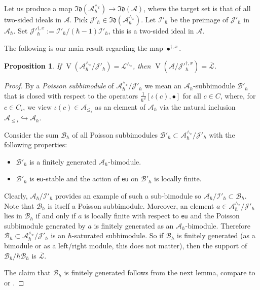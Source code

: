 \documentclass[12pt]{amsart}
\newcommand{\A}{\mathcal{A}}
\newcommand{\I}{\mathcal{I}}
\newcommand{\VA}{\operatorname{V}}
\newcommand{\B}{\mathcal{B}}
\newcommand{\J}{\mathcal{J}}
\newtheorem{Prop}[Thm]{Proposition}
\theoremstyle{definition}
\begin{document}
Let us produce a map $\mathfrak{Id}(\A^{\wedge_x}_{\hbar})\rightarrow \mathfrak{Id}(\A)$,
where the target set is that of all two-sided ideals in $\A$. Pick $\J'_\hbar\in
\mathfrak{Id}(\A^{\wedge_x}_{\hbar})$. Let $\I'_\hbar$ be the preimage of $\J'_\hbar$
in $\A_\hbar$. Set $\J'^{\dagger,x}_\hbar:=\I'_\hbar/(\hbar-1)\I'_\hbar$, this is a two-sided
ideal in $\A$.


The following is our main result regarding the map $\bullet^{\dagger,x}$.

\begin{Prop}\label{Prop:support}
If $\VA(\A^{\wedge_x}_\hbar/\J'_{\hbar})=\mathcal{L}^{\wedge_x}$, then $\VA(\A/\J'^{\dagger,x}_\hbar)=\overline{\mathcal{L}}$.
\end{Prop}
\begin{proof}
By a {\it Poisson subbimodule} of $\A^{\wedge_x}_\hbar/\J'_\hbar$ we mean
an $\A_\hbar$-subbimodule $\B'_\hbar$ that is closed with respect
to the operators $\frac{1}{\hbar^d}[\iota(c),\bullet]$ for all $c\in C$, where,
for $c\in C_i$, we view $\iota(c)\in \A_{\leqslant _i}$ as an element
of $\A_\hbar$ via the natural inclusion $\A_{\leqslant i}\hookrightarrow \A_{\hbar}$.

Consider the sum $\B_\hbar$ of all  Poisson subbimodules $\B'_\hbar\subset\A^{\wedge_x}_\hbar/\J'_\hbar$ with the following
properties:
\begin{itemize}
\item $\B'_\hbar$ is a finitely generated $\A_\hbar$-bimodule.
\item $\B'_\hbar$ is $\mathsf{eu}$-stable and the action of $\mathsf{eu}$ on $\B'_\hbar$ is locally finite.
\end{itemize}
Clearly, $\A_\hbar/\I'_\hbar$ provides an example of such a sub-bimodule so $\A_\hbar/\I'_\hbar
\subset \B_\hbar$.
Note that $\B_\hbar$ is itself a Poisson subbimodule. Moreover, an element $a\in \A^{\wedge_x}_\hbar/\J'_\hbar$
lies in $\B_\hbar$ if and only if $a$ is locally finite with respect to $\mathsf{eu}$ and
the Poisson subbimodule generated by $a$ is finitely generated as an $\A_\hbar$-bimodule.
Therefore $\B_\hbar\subset\A^{\wedge_x}_\hbar/\J'_{\hbar}$ is an $\hbar$-saturated
subbimodule. So if $\B_\hbar$ is finitely generated (as a bimodule or as a left/right module,
this does not matter), then the support of $\B_\hbar/\hbar \B_\hbar$ is $\overline{\mathcal{L}}$.


The claim that $\mathcal{B}_\hbar$ is finitely generated follows from
the next lemma,
compare to %
\cite[Proposition 3.7.2]{sraco} or \cite[Lemma 3.3.3]{HC}.
\end{proof}
\end{document}
